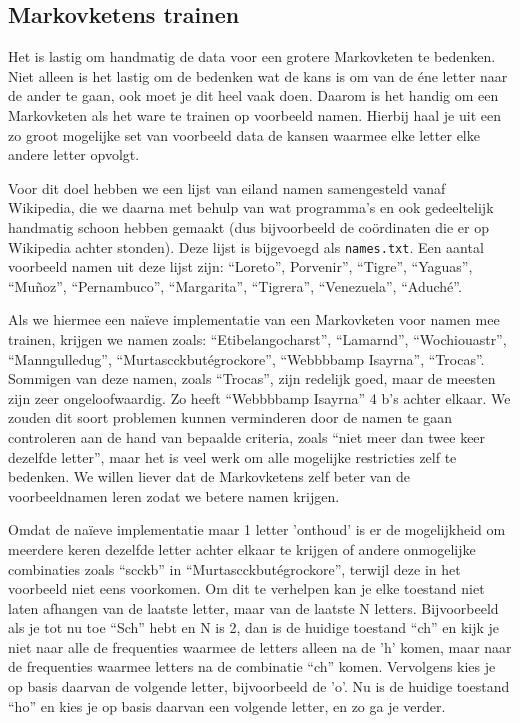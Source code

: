 \documentclass{article}
\begin{document}
\subsection{Markovketens trainen}

Het is lastig om handmatig de data voor een grotere Markovketen te bedenken. Niet alleen is het lastig om de bedenken wat de kans is om van de éne letter naar de ander te gaan, ook moet je dit heel vaak doen. Daarom is het handig om een Markovketen als het ware te trainen op voorbeeld namen. Hierbij haal je uit een zo groot mogelijke set van voorbeeld data de kansen waarmee elke letter elke andere letter opvolgt.

Voor dit doel hebben we een lijst van eiland namen samengesteld vanaf Wikipedia, die we daarna met behulp van wat programma's en ook gedeeltelijk handmatig schoon hebben gemaakt (dus bijvoorbeeld de coördinaten die er op Wikipedia achter stonden). Deze lijst is bijgevoegd als \texttt{names.txt}. Een aantal voorbeeld namen uit deze lijst zijn: “Loreto”, Porvenir”, “Tigre”, “Yaguas”, “Muñoz”, “Pernambuco”, “Margarita”, “Tigrera”, “Venezuela”, “Aduché”.


Als we hiermee een naïeve implementatie van een Markovketen voor namen mee trainen, krijgen we namen zoals: “Etibelangocharst”, “Lamarnd”, “Wochiouastr”, “Manngulledug”, “Murtascckbutégrockore”, “Webbbbamp Isayrna”, “Trocas”. Sommigen van deze namen, zoals “Trocas”, zijn redelijk goed, maar de meesten zijn zeer ongeloofwaardig. Zo heeft “Webbbbamp Isayrna” 4 b's achter elkaar. We zouden dit soort problemen kunnen verminderen door de namen te gaan controleren aan de hand van bepaalde criteria, zoals “niet meer dan twee keer dezelfde letter”, maar het is veel werk om alle mogelijke restricties zelf te bedenken. We willen liever dat de Markovketens zelf beter van de voorbeeldnamen leren zodat we betere namen krijgen.

Omdat de naïeve implementatie maar 1 letter 'onthoud' is er de mogelijkheid om meerdere keren dezelfde letter achter elkaar te krijgen of andere onmogelijke combinaties zoals “scckb” in “Murtascckbutégrockore”, terwijl deze in het voorbeeld niet eens voorkomen. Om dit te verhelpen kan je elke toestand niet laten afhangen van de laatste letter, maar van de laatste N letters. Bijvoorbeeld als je tot nu toe “Sch” hebt en N is 2, dan is de huidige toestand “ch” en kijk je niet naar alle de frequenties waarmee de letters alleen na de 'h' komen, maar naar de frequenties waarmee letters na de combinatie “ch” komen. Vervolgens kies je op basis daarvan de volgende letter, bijvoorbeeld de 'o'. Nu is de huidige toestand “ho” en kies je op basis daarvan een volgende letter, en zo ga je verder.
\end{document}

